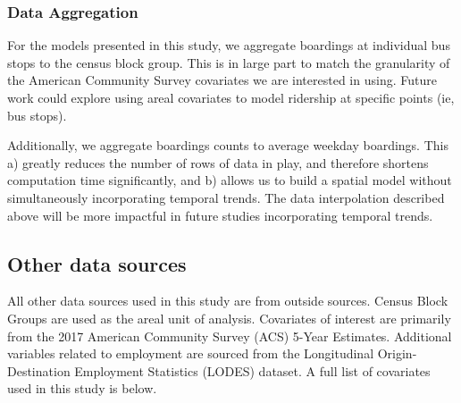 \documentclass[
]{article}
\begin{document}
\hypertarget{data-aggregation}{%
\subsubsection{Data Aggregation}\label{data-aggregation}}

For the models presented in this study, we aggregate boardings at
individual bus stops to the census block group. This is in large part to
match the granularity of the American Community Survey covariates we are
interested in using. Future work could explore using areal covariates to
model ridership at specific points (ie, bus stops).

Additionally, we aggregate boardings counts to average weekday
boardings. This a) greatly reduces the number of rows of data in play,
and therefore shortens computation time significantly, and b) allows us
to build a spatial model without simultaneously incorporating temporal
trends. The data interpolation described above will be more impactful in
future studies incorporating temporal trends.

\hypertarget{other-data-sources}{%
\subsection{Other data sources}\label{other-data-sources}}

All other data sources used in this study are from outside sources.
Census Block Groups are used as the areal unit of analysis. Covariates
of interest are primarily from the 2017 American Community Survey (ACS)
5-Year Estimates. Additional variables related to employment are sourced
from the Longitudinal Origin-Destination Employment Statistics (LODES)
dataset. A full list of covariates used in this study is below.
\end{document}
